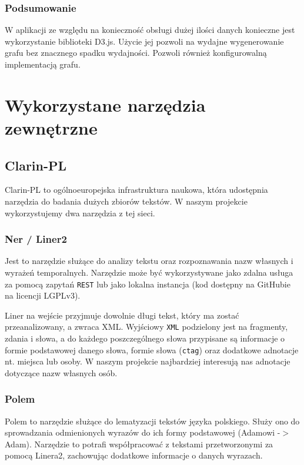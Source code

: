 \documentclass[12pt,a4paper]{article} %
\begin{document}
    \subsubsection{Podsumowanie}
        W aplikacji ze względu na konieczność obsługi dużej ilości danych konieczne jest wykorzystanie biblioteki D3.js. Użycie jej pozwoli na wydajne wygenerowanie grafu bez znacznego spadku wydajności. Pozwoli również konfigurowalną implementacją grafu.



\newpage
\section{Wykorzystane narzędzia zewnętrzne}
\subsection{Clarin-PL}
Clarin-PL to ogólnoeuropejska infrastruktura naukowa, która udostępnia narzędzia do badania dużych zbiorów tekstów. W naszym projekcie wykorzystujemy dwa narzędzia z tej sieci.

\subsubsection{Ner / Liner2}
Jest to narzędzie służące do analizy tekstu oraz rozpoznawania nazw własnych i wyrażeń temporalnych. Narzędzie może być wykorzystywane jako zdalna usługa za pomocą zapytań \texttt{REST} lub jako lokalna instancja (kod dostępny na GitHubie na licencji LGPLv3).

Liner na wejście przyjmuje dowolnie długi tekst, który ma zostać przeanalizowany, a zwraca XML. Wyjściowy \texttt{XML} podzielony jest na fragmenty, zdania i słowa, a do każdego poszczególnego słowa przypisane są informacje o formie podstawowej danego słowa, formie słowa (\texttt{ctag}) oraz dodatkowe adnotacje nt. miejsca lub osoby. W naszym projekcie najbardziej interesują nas adnotacje dotyczące nazw własnych osób.

\subsubsection{Polem}
Polem to narzędzie służące do lematyzacji tekstów języka polskiego. Służy ono do sprowadzania odmienionych wyrazów do ich formy podstawowej (Adamowi -$>$ Adam). Narzędzie to potrafi współpracować z tekstami przetworzonymi za pomocą Linera2, zachowując dodatkowe informacje o danych wyrazach.
\end{document}
